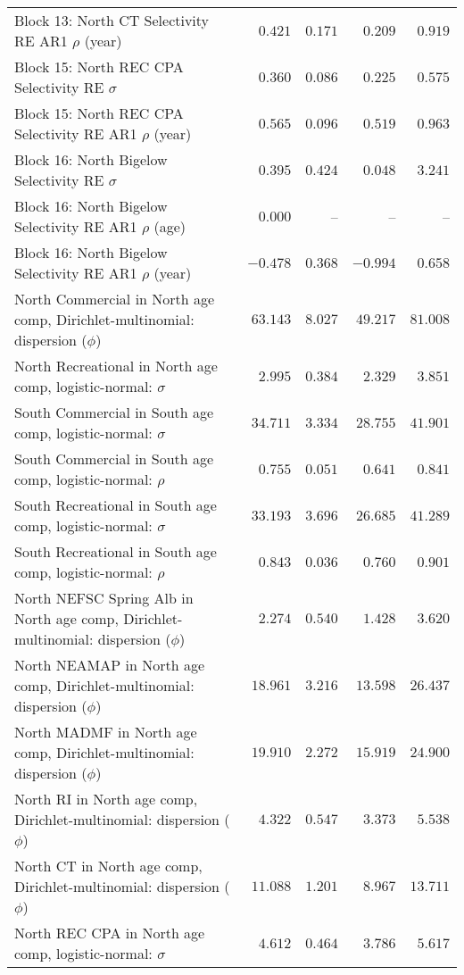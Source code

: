 \documentclass[
]{article}
\begin{document}
\begin{landscape}
\begin{longtable}[t]{lrrrr}
Block 13: North CT Selectivity RE AR1 $\rho$ (year) & $0.421$ & $0.171$ & $0.209$ & $0.919$\\
\addlinespace
Block 15: North REC CPA Selectivity RE $\sigma$ & $0.360$ & $0.086$ & $0.225$ & $0.575$\\
Block 15: North REC CPA Selectivity RE AR1 $\rho$ (year) & $0.565$ & $0.096$ & $0.519$ & $0.963$\\
Block 16: North Bigelow Selectivity RE $\sigma$ & $0.395$ & $0.424$ & $0.048$ & $3.241$\\
Block 16: North Bigelow Selectivity RE AR1 $\rho$ (age) & $0.000$ & -- & -- & --\\
Block 16: North Bigelow Selectivity RE AR1 $\rho$ (year) & $-0.478$ & $0.368$ & $-0.994$ & $0.658$\\
\addlinespace
North Commercial in North age comp, Dirichlet-multinomial: dispersion ($\phi$) & $63.143$ & $8.027$ & $49.217$ & $81.008$\\
North Recreational in North age comp, logistic-normal: $\sigma$ & $2.995$ & $0.384$ & $2.329$ & $3.851$\\
South Commercial in South age comp, logistic-normal: $\sigma$ & $34.711$ & $3.334$ & $28.755$ & $41.901$\\
South Commercial in South age comp, logistic-normal: $\rho$ & $0.755$ & $0.051$ & $0.641$ & $0.841$\\
South Recreational in South age comp, logistic-normal: $\sigma$ & $33.193$ & $3.696$ & $26.685$ & $41.289$\\
\addlinespace
South Recreational in South age comp, logistic-normal: $\rho$ & $0.843$ & $0.036$ & $0.760$ & $0.901$\\
North NEFSC Spring Alb in North age comp, Dirichlet-multinomial: dispersion ($\phi$) & $2.274$ & $0.540$ & $1.428$ & $3.620$\\
North NEAMAP in North age comp, Dirichlet-multinomial: dispersion ($\phi$) & $18.961$ & $3.216$ & $13.598$ & $26.437$\\
North MADMF in North age comp, Dirichlet-multinomial: dispersion ($\phi$) & $19.910$ & $2.272$ & $15.919$ & $24.900$\\
North RI in North age comp, Dirichlet-multinomial: dispersion ($\phi$) & $4.322$ & $0.547$ & $3.373$ & $5.538$\\
\addlinespace
North CT in North age comp, Dirichlet-multinomial: dispersion ($\phi$) & $11.088$ & $1.201$ & $8.967$ & $13.711$\\
North REC CPA in North age comp, logistic-normal: $\sigma$ & $4.612$ & $0.464$ & $3.786$ & $5.617$\\

\end{longtable}
\end{landscape}
\end{document}
